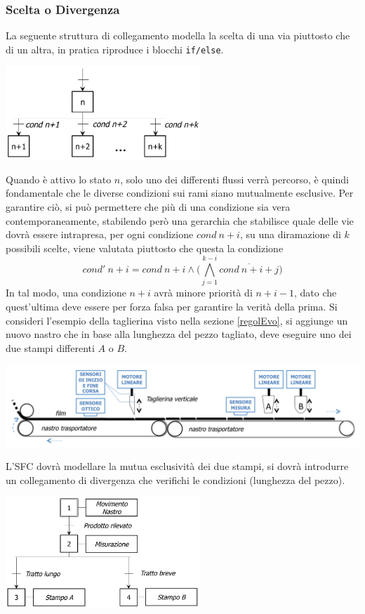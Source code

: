 \documentclass[10pt, letterpaper]{report}
\begin{document}
\subsubsection{Scelta o Divergenza}
La seguente struttura di collegamento modella la scelta di una via piuttosto che di un altra, in pratica riproduce i blocchi \texttt{if/else}.
\begin{center}
    \includegraphics[width=0.55\textwidth ]{images/scletaDiverg.png}
\end{center}
Quando è attivo lo stato $n$, solo uno dei differenti flussi verrà percorso, è quindi fondamentale che le diverse condizioni sui rami siano mutualmente esclusive. Per garantire ciò, si può permettere che più di una condizione sia vera contemporaneamente, stabilendo però una gerarchia che stabilisce quale delle vie dovrà essere intrapresa, per ogni condizione $cond \ n+i$, su una diramazione di $k$ possibili scelte, viene valutata piuttosto che questa la condizione 
$$ cond'\ n+i=cond\ n+i \land \Big( \bigwedge_{j=1}^{k-i}\overline{cond\ n+i+j} \Big)$$
In tal modo, una condizione $n+i$ avrà minore priorità di $n+i-1$, dato che quest'ultima deve essere per forza falsa per garantire la verità della prima.\acc 
Si consideri l'esempio della taglierina visto nella sezione \ref{regolEvo}, si aggiunge un nuovo nastro che in base alla lunghezza del pezzo tagliato, deve eseguire uno dei due stampi differenti $A$ o $B$.
\begin{center}
    \includegraphics[width=1\textwidth ]{images/taglierina2.png}
\end{center}
L'SFC dovrà modellare la mutua esclusività dei due stampi, si dovrà introdurre un collegamento di divergenza che verifichi le condizioni (lunghezza del pezzo).
\begin{center}
    \includegraphics[width=0.55\textwidth ]{images/scletaDiverg2.png}
\end{center}
\end{document}
